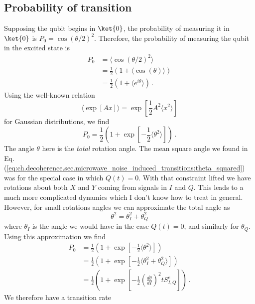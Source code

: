 \subsection{Probability of transition}

Supposing the qubit begins in $\ket{0}$, the probability of measuring it in $\ket{0}$ is
$P_0 = \cos(\theta / 2)^2$.
Therefore, the probability of measuring the qubit in the excited state is
\begin{align}
P_0 &= \langle \cos(\theta / 2)^2 \rangle \\
&= \frac{1}{2} \left( 1 + \langle \cos(\theta) \rangle \right) \\
&= \frac{1}{2} \left( 1 + \langle e^{i \theta} \rangle \right) \, .
\end{align}
Using the well-known relation
\begin{equation}
\langle \exp [ Ax ] \rangle = \exp \left[ \frac{1}{2} A^2 \langle x^2 \rangle \right]
\end{equation}
for Gaussian distributions, we find
\begin{equation}
P_0 = \frac{1}{2} \left( 1 + \exp \left[ -\frac{1}{2} \langle \theta^2 \rangle \right] \right) \, .
\end{equation}
The angle $\theta$ here is the \emph{total} rotation angle.
The mean square angle we found in Eq.\,(\ref{eq:ch.decoherence.sec.microwave_noise_induced_transitions:theta_squared}) was for the special case in which $Q(t)=0$.
With that constraint lifted we have rotations about both $X$ and $Y$ coming from signals in $I$ and $Q$.
This leads to a much more complicated dynamics which I don't know how to treat in general.
However, for small rotations angles we can approximate the total angle as
\begin{equation}
\theta^2 = \theta_I^2 + \theta_Q^2
\end{equation}
where $\theta_I$ is the angle we would have in the case $Q(t)=0$, and similarly for $\theta_Q$.
Using this approximation we find
\begin{align}
P_0
&= \frac{1}{2} \left( 1 + \exp \left[ - \frac{1}{2} \langle \theta^2 \rangle \right] \right) \\
&= \frac{1}{2} \left( 1 + \exp \left[ - \frac{1}{2} \langle \theta_I^2 + \theta_Q^2 \rangle \right] \right) \\
&= \frac{1}{2} \left( 1 + \exp \left[ - \frac{1}{2} \left( \frac{d \dot{\theta}}{dI}\right)^2 t S_{I,Q}^e \right] \right) \, .
\end{align}
We therefore have a transition rate
